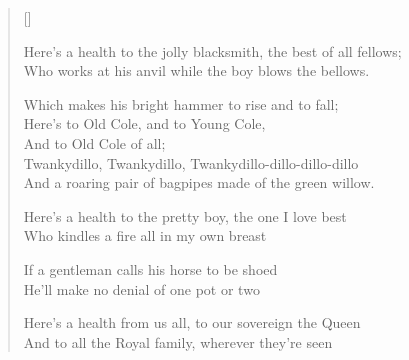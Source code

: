 \pagebreak
\settowidth{\versewidth}{Here's a health to the jolly blacksmith, the best of all fellows}
\begin{verse}[\versewidth]


Here's a health to the jolly blacksmith, the best of all fellows;\\
Who works at his anvil while the boy blows the bellows.
\begin{chorus}
Which makes his bright hammer to rise and to fall;\\
Here's to Old Cole, and to Young Cole,\\
And to Old Cole of all;\\
Twankydillo, Twankydillo, Twankydillo-dillo-dillo-dillo\\
And a roaring pair of bagpipes made of the green willow.
\end{chorus}

Here's a health to the pretty boy, the one I love best\\
Who kindles a fire all in my own breast

If a gentleman calls his horse to be shoed\\
He'll make no denial of one pot or two

Here's a health from us all, to our sovereign the Queen\\
And to all the Royal family, wherever they're seen
\end{verse}